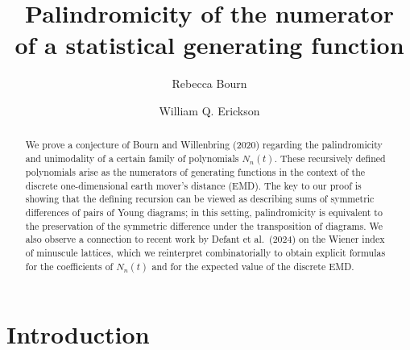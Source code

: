 \documentclass[11pt]{amsart}
\theoremstyle{plain}
\theoremstyle{definition}
\numberwithin{equation}{section}
\begin{document}
\title{
Palindromicity of the numerator \\ of a statistical generating function}

\author{Rebecca Bourn}
\address{
Rebecca Bourn\\
Department of Mathematical Sciences\\
University of Wisconsin--Milwaukee \\ 
3200 N.~Cramer St.\\
Milwaukee, WI 53211} 

\author{William Q. Erickson}
\address{
William Q.~Erickson\\
Department of Mathematics\\
Baylor University \\ 
One Bear Place \#97328\\
Waco, TX 76798} 

\begin{abstract}
    We prove a conjecture of Bourn and Willenbring (2020) regarding the palindromicity and unimodality of a certain family of polynomials $N_n(t)$.
    These recursively defined polynomials arise as the numerators of generating functions in the context of the discrete one-dimensional earth mover's distance (EMD).
    The key to our proof is showing that the defining recursion can be viewed as describing sums of symmetric differences of pairs of Young diagrams; in this setting, palindromicity is equivalent to the preservation of the symmetric difference under the transposition of diagrams.
    We also observe a connection to recent work by Defant et al.~(2024) on the Wiener index of minuscule lattices, which we reinterpret combinatorially to obtain explicit formulas for the coefficients of $N_n(t)$ and for the expected value of the discrete EMD.
    
\end{abstract}



\maketitle

\section{Introduction}
\end{document}
